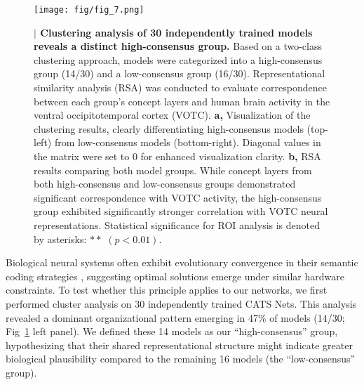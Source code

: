 \documentclass[pdflatex,sn-mathphys-num,lineno]{sn-jnl}%
\begin{document}
\begin{CJK}{UTF8}{gbsn}
\begin{figure}[htbp]
\centering
\texttt{[image: fig/fig\_7.png]}
\caption{\textbf{$\vert$ Clustering analysis of 30 independently trained models reveals a distinct high-consensus group.} Based on a two-class clustering approach, models were categorized into a high-consensus group (14/30) and a low-consensus group (16/30). Representational similarity analysis (RSA) was conducted to evaluate correspondence between each group's concept layers and human brain activity in the ventral occipitotemporal cortex (VOTC). \textbf{a,} Visualization of the clustering results, clearly differentiating high-consensus models (top-left) from low-consensus models (bottom-right). Diagonal values in the matrix were set to 0 for enhanced visualization clarity. \textbf{b,} RSA results comparing both model groups. While concept layers from both high-consensus and low-consensus groups demonstrated significant correspondence with VOTC activity, the high-consensus group exhibited significantly stronger correlation with VOTC neural representations. Statistical significance for ROI analysis is denoted by asterisks: $**$ $(p < 0.01)$.}
\label{fig7}
\end{figure}

Biological neural systems often exhibit evolutionary convergence in their semantic coding strategies \cite{carandini_normalization_2012}, suggesting optimal solutions emerge under similar hardware constraints. To test whether this principle applies to our networks, we first performed cluster analysis on 30 independently trained CATS Nets. This analysis revealed a dominant organizational pattern emerging in 47\% of models (14/30; Fig~\ref{fig7} left panel). We defined these 14 models as our “high-consensus” group, hypothesizing that their shared representational structure might indicate greater biological plausibility compared to the remaining 16 models (the “low-consensus” group).


\end{CJK}
\end{document}
